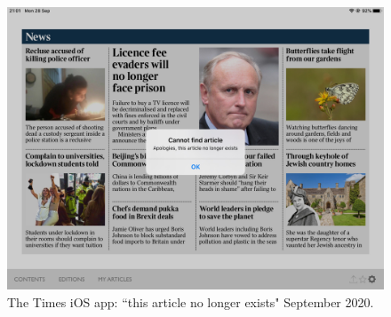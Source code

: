 \begin{figure}[!htbp]
    \centering
    \includegraphics[width=13cm]{images/ios-screenshots/The-Times-iOS-Screenshot-2020-09-28.png}
    \caption{The Times iOS app: ``this article no longer exists"  September 2020.}
    \label{fig:thetimes-ios-this-article-no-longer-exists}
\end{figure}
